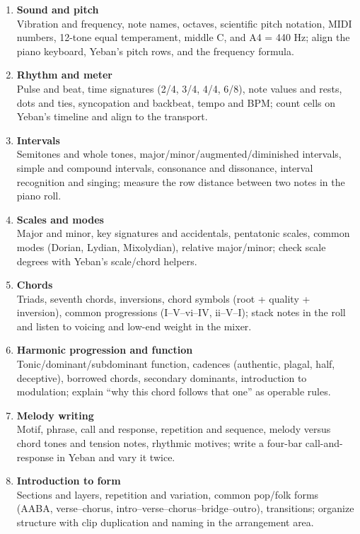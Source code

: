 \begin{enumerate}[label=\textbf{Chapter \arabic*}]
  \item \textbf{Sound and pitch}\\
  Vibration and frequency, note names, octaves, scientific pitch notation, MIDI numbers, 12-tone equal temperament, middle C, and A4 = 440 Hz; align the piano keyboard, Yeban's pitch rows, and the frequency formula.
  \item \textbf{Rhythm and meter}\\
  Pulse and beat, time signatures (2/4, 3/4, 4/4, 6/8), note values and rests, dots and ties, syncopation and backbeat, tempo and BPM; count cells on Yeban's timeline and align to the transport.
  \item \textbf{Intervals}\\
  Semitones and whole tones, major/minor/augmented/diminished intervals, simple and compound intervals, consonance and dissonance, interval recognition and singing; measure the row distance between two notes in the piano roll.
  \item \textbf{Scales and modes}\\
  Major and minor, key signatures and accidentals, pentatonic scales, common modes (Dorian, Lydian, Mixolydian), relative major/minor; check scale degrees with Yeban's scale/chord helpers.
  \item \textbf{Chords}\\
  Triads, seventh chords, inversions, chord symbols (root + quality + inversion), common progressions (I–V–vi–IV, ii–V–I); stack notes in the roll and listen to voicing and low-end weight in the mixer.
  \item \textbf{Harmonic progression and function}\\
  Tonic/dominant/subdominant function, cadences (authentic, plagal, half, deceptive), borrowed chords, secondary dominants, introduction to modulation; explain ``why this chord follows that one'' as operable rules.
  \item \textbf{Melody writing}\\
  Motif, phrase, call and response, repetition and sequence, melody versus chord tones and tension notes, rhythmic motives; write a four-bar call-and-response in Yeban and vary it twice.
  \item \textbf{Introduction to form}\\
  Sections and layers, repetition and variation, common pop/folk forms (AABA, verse–chorus, intro–verse–chorus–bridge–outro), transitions; organize structure with clip duplication and naming in the arrangement area.

\end{enumerate}
